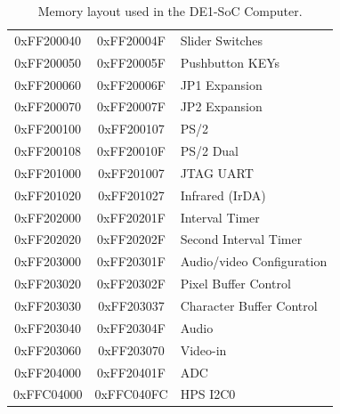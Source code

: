 \documentclass[11pt, twoside, pdftex]{article}
\newcommand{\commonFiles}{../../../common/doc}
\newcommand{\templatePath}{../../../common/templates}
\newcommand{\systemName}{DE1-SoC Computer}
\begin{document}
\begin{table}[h]
\begin{center}
\begin{tabular}{c|c|l}
        \\
            0xFF200040
            & 0xFF20004F
            & Slider Switches
        \\
            0xFF200050
            & 0xFF20005F
            & Pushbutton KEYs
        \\
            0xFF200060
            & 0xFF20006F
            & JP1 Expansion
        \\
            0xFF200070
            & 0xFF20007F
            & JP2 Expansion
        \\
            0xFF200100
            & 0xFF200107
            & PS/2
        \\
            0xFF200108
            & 0xFF20010F
            & PS/2 Dual
        \\
            0xFF201000
            & 0xFF201007
            & JTAG UART
        \\
            0xFF201020
            & 0xFF201027
				& Infrared (IrDA)
        \\
            0xFF202000
            & 0xFF20201F
            & Interval Timer
        \\
            0xFF202020
            & 0xFF20202F
            & Second Interval Timer
        \\
            0xFF203000
            & 0xFF20301F
            & Audio/video Configuration
        \\
            0xFF203020
            & 0xFF20302F
            & Pixel Buffer Control
        \\
            0xFF203030
            & 0xFF203037
            & Character Buffer Control
        \\
            0xFF203040
            & 0xFF20304F
            & Audio
        \\
            0xFF203060
            & 0xFF203070
            & Video-in
        \\
            0xFF204000
            & 0xFF20401F
            & ADC
        \\
            0xFFC04000
            & 0xFFC040FC
            & HPS I2C0
        \\
    \end{tabular}
    \caption{Memory layout used in the \systemName.}
    \label{tab:memorylayout}
    \end{center}
\end{table}


\clearpage












\end{document}

